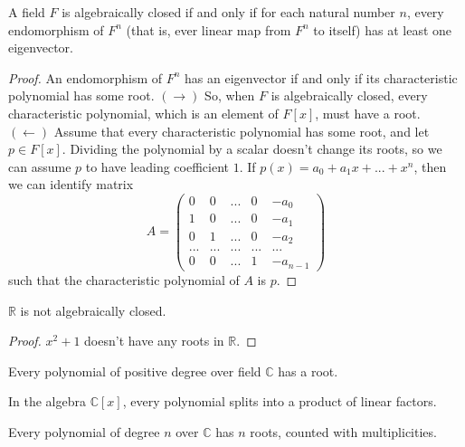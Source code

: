 \documentclass{article}
\begin{document}
      \begin{proposition}
        A field $F$ is algebraically closed if and only if for each natural number $n$, every endomorphism of $F^n$ (that is, ever linear map from $F^n$ to itself) has at least one eigenvector. 
      \end{proposition}
      \begin{proof}
        An endomorphism of $F^n$ has an eigenvector if and only if its characteristic polynomial has some root. $(\rightarrow)$ So, when $F$ is algebraically closed, every characteristic polynomial, which is an element of $F[x]$, must have a root. $(\leftarrow)$ Assume that every characteristic polynomial has some root, and let $p \in F[x]$. Dividing the polynomial by a scalar doesn't change its roots, so we can assume $p$ to have leading coefficient $1$. If $p(x) = a_0 + a_1 x + ... + x^n$, then we can identify matrix 
        \begin{equation}
          A = \begin{pmatrix}
          0 & 0 & ... & 0 & -a_0 \\
          1 & 0 & ... & 0 & -a_1 \\
          0 & 1 & ... & 0 & -a_2 \\
          ... & ... & ... & ... & ... \\
          0 & 0 & ... & 1 & -a_{n-1}
          \end{pmatrix}
        \end{equation}
        such that the characteristic polynomial of $A$ is $p$. 
      \end{proof}

      \begin{proposition}
        $\mathbb{R}$ is not algebraically closed. 
      \end{proposition}
      \begin{proof}
        $x^2 + 1$ doesn't have any roots in $\mathbb{R}$. 
      \end{proof}

      \begin{theorem}
        Every polynomial of positive degree over field $\mathbb{C}$ has a root. 
      \end{theorem}

      \begin{corollary}
        In the algebra $\mathbb{C}[x]$, every polynomial splits into a product of linear factors. 
      \end{corollary}

      \begin{corollary}
        Every polynomial of degree $n$ over $\mathbb{C}$ has $n$ roots, counted with multiplicities. 
      \end{corollary}
\end{document}
